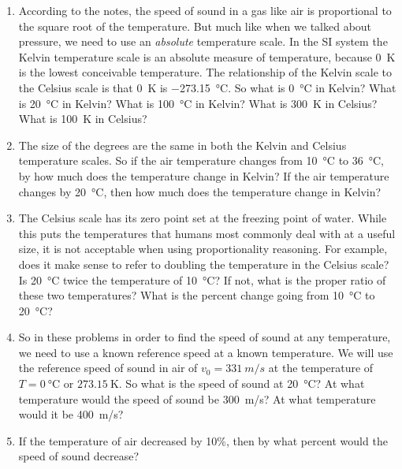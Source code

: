 \begin{enumerate}
	\setlength\itemsep{2 in}
	
	\item
	According to the notes, the speed of sound in a gas like air is proportional to the square root of the temperature. But much like when we talked about pressure, we need to use an \emph{absolute} temperature scale. In the SI system the Kelvin temperature scale is an absolute measure of temperature, because \SI{0}{\kelvin} is the lowest conceivable temperature. The relationship of the Kelvin scale to the Celsius scale is that \SI{0}{\kelvin} is \SI{-273.15}{\celsius}. So what is \SI{0}{\celsius} in Kelvin? What is \SI{20}{\celsius} in Kelvin? What is \SI{100}{\celsius} in Kelvin? What is \SI{300}{\kelvin} in Celsius? What is \SI{100}{\kelvin} in Celsius?
	
	\item
	The size of the degrees are the same in both the Kelvin and Celsius temperature scales. So if the air temperature changes from \SI{10}{\celsius} to \SI{36}{\celsius}, by how much does the temperature change in Kelvin? If the air temperature changes by \SI{20}{\celsius}, then how much does the temperature change in Kelvin?
	
	\item
	The Celsius scale has its zero point set at the freezing point of water. While this puts the temperatures that humans most commonly deal with at a useful size, it is not acceptable when using proportionality reasoning. For example, does it make sense to refer to doubling the temperature in the Celsius scale? Is \SI{20}{\celsius} twice the temperature of \SI{10}{\celsius}? If not, what is the proper ratio of these two temperatures? What is the percent change going from \SI{10}{\celsius} to \SI{20}{\celsius}?
	
	\item
	So in these problems in order to find the speed of sound at any temperature, we need to use a known reference speed at a known temperature. We will use the reference speed of sound in air of $v_0 = \SI{331}{m/s}$ at the temperature of $T=\SI{0}{\celsius}$ or $\SI{273.15}{\kelvin}$. So what is the speed of sound at \SI{20}{\celsius}? At what temperature would the speed of sound be \SI{300}{m/s}? At what temperature would it be \SI{400}{m/s}?
	
	\item
	If the temperature of air decreased by 10\%, then by what percent would the speed of sound decrease?
	

\end{enumerate}
